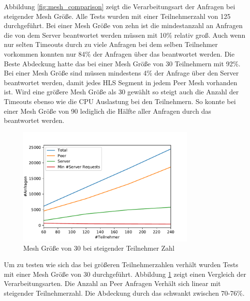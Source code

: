 Abbildung \ref{fig:mesh_comparison} zeigt die Verarbeitungsart der Anfragen bei steigender Mesh Größe. Alle Tests wurden mit einer Teilnehmerzahl von 125 durchgeführt. Bei einer Mesh Größe von zehn ist die mindestanzahl an Anfragen die von dem Server beantwortet werden müssen mit 10\% relativ groß. Auch wenn nur selten Timeouts durch zu viele Anfragen bei dem selben Teilnehmer vorkommen konnten nur 84\% der Anfragen über das \pTp \cdn beantwortet werden. Die Beste Abdeckung hatte das \cdn bei einer Mesh Größe von 30 Teilnehmern mit 92\%. Bei einer Mesh Größe sind müssen mindestens 4\% der Anfrage über den Server beantwortet werden, damit jedes HLS Segment in jedem Peer Mesh vorhanden ist. Wird eine größere Mesh Größe als 30 gewählt so steigt auch die Anzahl der Timeouts ebenso wie die CPU Auslastung bei den Teilnehmern. So konnte bei einer Mesh Größe von 90 lediglich die Hälfte aller Anfragen durch das \pTp \cdn beantwortet werden.


\begin{figure}[!h]
	\centering
	\includegraphics[width=0.8\textwidth]{figures/meshed_30_line}
	\caption[A Figure Short-Title]{Mesh Größe von 30 bei steigender Teilnehmer Zahl}
	\label{fig:meshed_30_line}
\end{figure}

Um zu testen wie sich das \cdn bei größeren Teilnehmerzahlen verhält wurden Tests mit einer Mesh Größe von 30 durchgeführt. Abbildung \ref{fig:meshed_30_line} zeigt einen Vergleich der Verarbeitungsarten. Die Anzahl an Peer Anfragen Verhält sich linear mit steigender Teilnehmerzahl. Die Abdeckung durch das \cdn schwankt zwischen 70-76\%.


